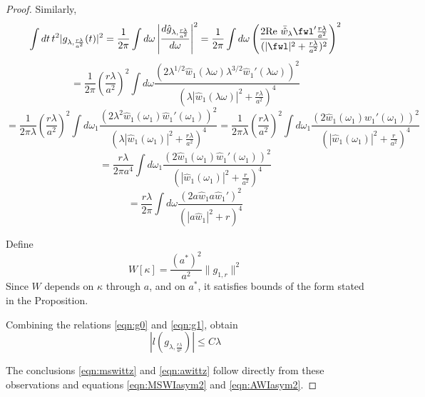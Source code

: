 \begin{proof}
Similarly,
\[
  \int dt\, t^2|g_{\lambda,\frac{r\lambda}{a^2}}(t)|^2 = \frac{1}{2\pi} \int d\omega
  \left|\frac{d\hat{g}_{\lambda,\frac{r\lambda}{a^2}}}{d\omega}\right|^2
  =  \frac{1}{2\pi} \int d\omega  \left(\frac{2 \mbox{Re }\bar{\hat{w}}_{\lambda}\fwl' 
    \frac{r\lambda}{a^2}}{(|\fwl|^2 + \frac{r\lambda}{a^2})^2}\right)^2
\]
\[
  =\frac{1}{2\pi}\left(\frac{r\lambda}{a^2}\right)^2 \int d\omega \frac{(2 \lambda^{1/2}\hat{w}_1(\lambda
    \omega)\lambda^{3/2}\hat{w}_1'(\lambda \omega))^2}{(\lambda|\hat{w}_1(\lambda
    \omega)|^2 + \frac{r\lambda}{a^2})^4}
\]
\[
  =\frac{1}{2\pi\lambda}\left(\frac{r\lambda}{a^2}\right)^2\int d\omega_1 \frac{(2 \lambda^2\hat{w}_1(\omega_1)\hat{w}_1'( \omega_1))^2}{(\lambda|\hat{w}_1(
    \omega_1)|^2 + \frac{r\lambda}{a^2})^4}
  =\frac{1}{2 \pi \lambda}\left(\frac{r\lambda}{a^2}\right)^2\int d\omega_1
  \frac{(2\hat{w}_1(\omega_1)\hat{w}_1'( \omega_1)
    )^2}{\left(|\hat{w}_1(\omega_1)|^2 + \frac{r}{a^2}\right)^4}
\]
\[
  =\frac{r\lambda}{2\pi a^4}\int d\omega_1
  \frac{(2\hat{w}_1(\omega_1)\hat{w}_1'( \omega_1)
    )^2}{\left(|\hat{w}_1(\omega_1)|^2 + \frac{r}{a^2}\right)^4}
\]
\begin{equation}
  \label{eqn:g1}
 = \frac{r\lambda}{2\pi} \int d\omega
  \frac{(2a\hat{w}_1a\hat{w}_1'
    )^2}{\left(|a\hat{w}_1|^2 + r\right)^4}
\end{equation}

Define
\begin{equation}
  \label{eqn:Wdef}
  W[\kappa] = \frac{(a^*)^2}{a^2}\|g_{1,r}\|^2
\end{equation}
Since $W$ depends on $\kappa$ through $a$, and on $a^*$, it satisfies
bounds of the form stated in the Proposition. 

Combining the relations \ref{eqn:g0} and \ref{eqn:g1}, obtain
\begin{equation}
  \label{eqn:pwg}
  |l(g_{\lambda,\frac{r\lambda}{a^2}})| \le C \lambda
\end{equation}

The conclusions \ref{eqn:mswittz} and \ref{eqn:awittz} follow directly
from these observations and equations \ref{eqn:MSWIasym2} and
\ref{eqn:AWIasym2}.

%  

\end{proof}

